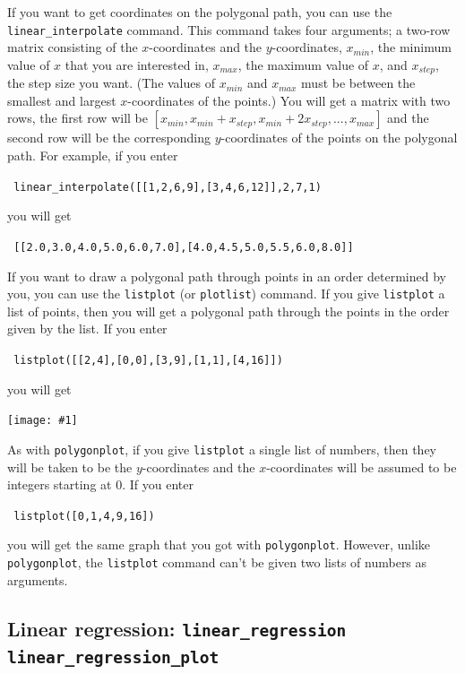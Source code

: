 \documentclass[a4paper,11pt]{book}
\newcommand{\includeimage}[1]
{\texttt{[image: \#1]}}
\begin{document}
If you want to get coordinates on the polygonal path, you can use the
\texttt{linear\_interpolate} command.  This command takes four
arguments; a two-row matrix consisting of the $x$-coordinates and the
$y$-coordinates, $x_{min}$, the minimum value of $x$ that you are
interested in, $x_{max}$, the maximum value of $x$, and
$x_{step}$, the step size you want.  (The values of $x_{min}$
and $x_{max}$ must be between the smallest and largest
$x$-coordinates of the points.)   You will get a matrix with
two rows, the first row will be 
$[x_{min}, x_{min}+x_{step}, x_{min}+2x_{step},...,x_{max}]$
and the second row will be the corresponding $y$-coordinates of the
points on the polygonal path.  For example, if you enter
\begin{center}
  \tt
  linear\_interpolate([[1,2,6,9],[3,4,6,12]],2,7,1)
\end{center}
you will get
\begin{center}
  \tt
  [[2.0,3.0,4.0,5.0,6.0,7.0],[4.0,4.5,5.0,5.5,6.0,8.0]]
\end{center}

If you want to draw a polygonal path through points in an order
determined by you, you can use the \texttt{listplot} (or
\texttt{plotlist}) command.  If you give \texttt{listplot} a list of
points, then you will get a polygonal path through the points in the
order given by the list.  If you enter
\begin{center}
  \tt
  listplot([[2,4],[0,0],[3,9],[1,1],[4,16]])  
\end{center}
you will get
\begin{center}
  \includeimage{xcas-listplot.png}
\end{center}

As with \texttt{polygonplot}, if you give \texttt{listplot} a single
list of numbers, then they will be taken to be the $y$-coordinates and
the $x$-coordinates will be assumed to be integers starting at $0$.
If you enter 
\begin{center}
  \tt
  listplot([0,1,4,9,16])
\end{center}
you will get the same graph that you got with \texttt{polygonplot}.
However, unlike \texttt{polygonplot}, the \texttt{listplot} command
can't be given two lists of numbers as arguments.

\subsection{Linear regression: \texttt{linear\_regression} \texttt{linear\_regression\_plot}}
\end{document}

